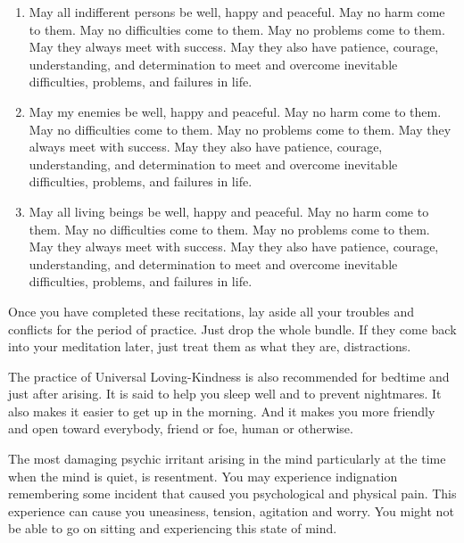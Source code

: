 \begin{enumerate}
\item May all indifferent persons be well, happy and peaceful. May no harm come to
them. May no difficulties come to them. May no problems come to them. May they
always meet with success. May they also have patience, courage, understanding,
and determination to meet and overcome inevitable difficulties, problems, and
failures in life.

\item May my enemies be well, happy and peaceful. May no harm come to them. May no
difficulties come to them. May no problems come to them. May they always meet
with success. May they also have patience, courage, understanding, and
determination to meet and overcome inevitable difficulties, problems, and
failures in life.

\item May all living beings be well, happy and peaceful. May no harm come to
them.  May no difficulties come to them.  May no problems come to them. May they
always meet with success. May they also have patience, courage, understanding,
and determination to meet and overcome inevitable difficulties, problems, and
failures in life.

\end{enumerate}

Once you have completed these recitations, lay aside all your troubles and
conflicts for the period of practice. Just drop the whole bundle. If they come
back into your meditation later, just treat them as what they are, distractions.

The practice of Universal Loving-Kindness is also recommended for bedtime and
just after arising. It is said to help you sleep well and to prevent nightmares.
It also makes it easier to get up in the morning. And it makes you more friendly
and open toward everybody, friend or foe, human or otherwise.

The most damaging psychic irritant arising in the mind particularly at the time
when the mind is quiet, is resentment. You may experience indignation
remembering some incident that caused you psychological and physical pain. This
experience can cause you uneasiness, tension, agitation and worry. You might not
be able to go on sitting and experiencing this state of mind.

